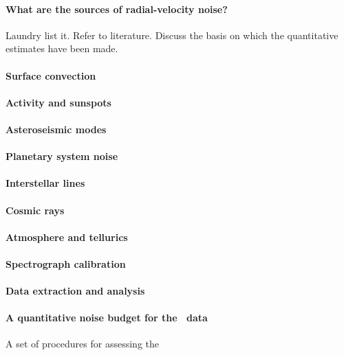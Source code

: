 \documentclass[12pt, fullpage, letterpaper]{article}
\begin{document}
\paragraph{What are the sources of radial-velocity noise?}
Laundry list it. Refer to literature. Discuss the basis on
which the quantitative estimates have been made.

\paragraph{Surface convection}

\paragraph{Activity and sunspots}

\paragraph{Asteroseismic modes}

\paragraph{Planetary system noise}

\paragraph{Interstellar lines}

\paragraph{Cosmic rays}

\paragraph{Atmosphere and tellurics}

\paragraph{Spectrograph calibration}

\paragraph{Data extraction and analysis}

\paragraph{A quantitative noise budget for the \HARPS\ data}
A set of procedures for assessing the 
\end{document}
